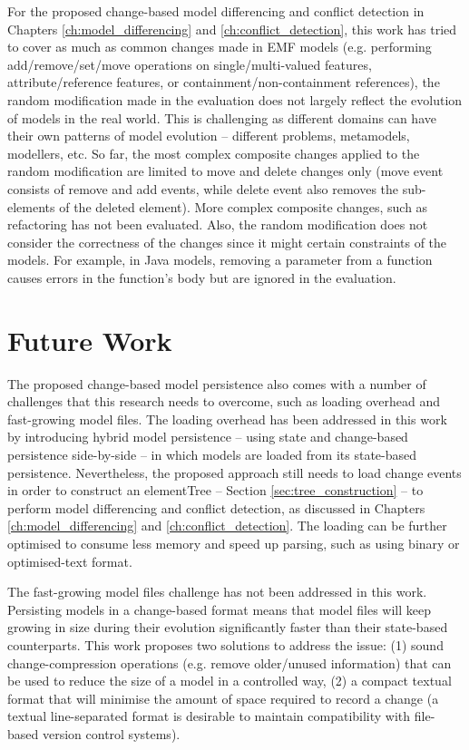 For the proposed change-based model differencing and conflict detection in Chapters \ref{ch:model_differencing} and \ref{ch:conflict_detection}, this work has tried to cover as much as common changes made in EMF models (e.g. performing \textsf{add}/\textsf{remove}/\textsf{set}/\textsf{move} operations on \textsf{single}/\textsf{multi}-\textsf{valued} features, \textsf{attribute}/\textsf{reference} features, or \textsf{containment}/\textsf{non}-\textsf{containment} references), the random modification made in the evaluation does not largely reflect the evolution of models in the real world. This is challenging as different domains can have their own patterns of model evolution -- different problems, metamodels, modellers, etc. So far, the most complex composite changes applied to the random modification are limited to \textsf{move} and \textsf{delete} changes only (\textsf{move} event consists of \textsf{remove} and {add} events, while \textsf{delete} event also removes the sub-elements of the deleted element). More complex composite changes, such as refactoring has not been evaluated. Also, the random modification does not consider the correctness of the changes since it might certain constraints of the models. For example, in Java \cite{eclipse2018modiscojava} models, removing a parameter from a function causes errors in the function's body but are ignored in the evaluation.  

\section{Future Work}
\label{future_work}
The proposed change-based model persistence also comes with a number of challenges that this research needs to overcome, such as loading overhead and fast-growing model files. The loading overhead has been addressed in this work by introducing hybrid model persistence -- using state and change-based persistence side-by-side -- in which models are loaded from its state-based persistence. Nevertheless, the proposed approach still needs to load change events in order to construct an \textsf{elementTree} -- Section \ref{sec:tree_construction} -- to perform model differencing and conflict detection, as discussed in Chapters \ref{ch:model_differencing} and \ref{ch:conflict_detection}. The loading can be further optimised to consume less memory and speed up parsing, such as using binary or optimised-text format.

The fast-growing model files challenge has not been addressed in this work. Persisting models in a change-based format means that model files will keep growing in size during their evolution significantly faster than their state-based counterparts. This work proposes two solutions to address the issue: (1) sound change-compression operations (e.g. remove older/unused information) that can be used to reduce the size of a model in a controlled way, (2) a compact textual format that will minimise the amount of space required to record a change (a textual line-separated format is desirable to maintain compatibility with file-based version control systems). 

